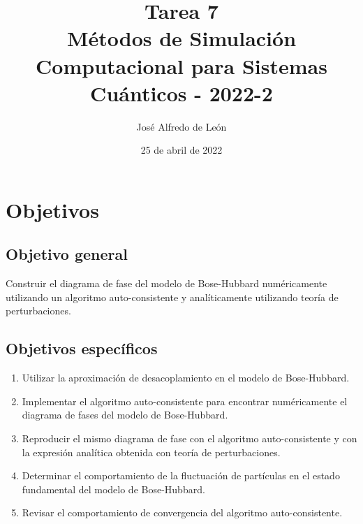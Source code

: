 \documentclass[11pt,letterpaper]{article}
\author{José Alfredo de León}
\title{Tarea 7\\
\large{Métodos de Simulación Computacional para Sistemas Cuánticos - 2022-2}}
\begin{document}
\date{25 de abril de 2022}
\maketitle

\section{Objetivos}
\subsection{Objetivo general}
Construir el diagrama de fase del modelo de Bose-Hubbard numéricamente
utilizando un algoritmo auto-consistente y analíticamente utilizando
teoría de perturbaciones.

\subsection{Objetivos específicos}
\begin{enumerate}
\item Utilizar la aproximación de desacoplamiento en el modelo de Bose-Hubbard.
\item Implementar el algoritmo auto-consistente para encontrar numéricamente
el diagrama de fases del modelo de Bose-Hubbard.
\item Reproducir el mismo diagrama de fase con el algoritmo auto-consistente 
y con la expresión analítica obtenida con teoría de perturbaciones.
\item Determinar el comportamiento de la fluctuación de partículas en 
el estado fundamental del modelo de Bose-Hubbard.
\item Revisar el comportamiento de convergencia del algoritmo auto-consistente.
\end{enumerate}
\end{document}
